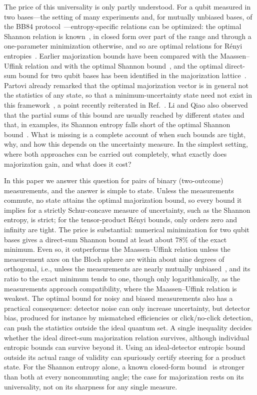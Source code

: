 \documentclass[aps,pra,twocolumn,superscriptaddress,nofootinbib,floatfix]{revtex4-2}
\theoremstyle{definition}
\begin{document}
The price of this universality is only partly understood.
For a qubit measured in two bases---the setting of many experiments and, for
mutually unbiased bases, of the BB84 protocol~\cite{BB84}---entropy-specific
relations can be optimized: the optimal Shannon relation is
known~\cite{SanchezRuiz1998,Ghirardi2003}, in closed form over part of the
range and through a one-parameter minimization otherwise, and so are optimal
relations for R\'enyi
entropies~\cite{BosykPortesiPlastino2012,ZozorBosykPortesi2013}.
Earlier majorization bounds have been compared with the Maassen--Uffink
relation and with the optimal Shannon bound~\cite{KTW2014,Baek2019}, and the
optimal direct-sum bound for two qubit bases has been identified in the
majorization lattice~\cite{LiQiao2019}. Partovi already remarked that the
optimal majorization vector is in general not the statistics of any state, so
that a minimum-uncertainty state need not exist in this
framework~\cite{Partovi2011}, a point recently reiterated in
Ref.~\cite{Conlon2026}. Li and Qiao also observed that the
partial sums of this bound are usually reached by different states and that, in
examples, its Shannon entropy falls short of the optimal Shannon
bound~\cite{LiQiao2018}.
What is missing is a complete account of when such bounds are tight, why, and
how this depends on the uncertainty measure. In the simplest setting, where
both approaches can be carried out completely, what exactly does majorization
gain, and what does it cost?

In this paper we answer this question for pairs of binary (two-outcome)
measurements, and the answer is simple to state.
Unless the measurements commute, no state attains the optimal majorization
bound, so every bound it implies for a strictly Schur-concave measure of
uncertainty, such as the Shannon entropy, is strict; for the tensor-product
R\'enyi bounds, only orders zero and infinity are tight.
The price is substantial: numerical minimization for two qubit bases gives a
direct-sum Shannon bound at least about $78\%$ of the exact minimum. Even so, it outperforms the
Maassen--Uffink relation unless the measurement axes on the Bloch sphere are
within about nine degrees of orthogonal, i.e., unless the measurements are
nearly mutually unbiased~\cite{Baek2019}, and its ratio to the exact minimum
tends to one, though only logarithmically, as the measurements approach
compatibility, where the Maassen--Uffink relation is weakest. The optimal bound
for noisy and biased measurements also has a practical consequence: detector
noise can only increase uncertainty, but detector bias, produced for instance by
mismatched efficiencies or click/no-click detection, can push the statistics
outside the ideal quantum set. A single inequality decides whether the ideal
direct-sum majorization relation survives, although individual entropic bounds
can survive beyond it. Using an ideal-detector entropic bound outside its actual
range of validity can spuriously certify steering for a product state. For the
Shannon
entropy alone, a known closed-form bound~\cite{SanchezRuiz1998,KTW2014} is
stronger than both at every noncommuting angle; the case for majorization rests on its
universality, not on its sharpness for any single measure.
\end{document}

